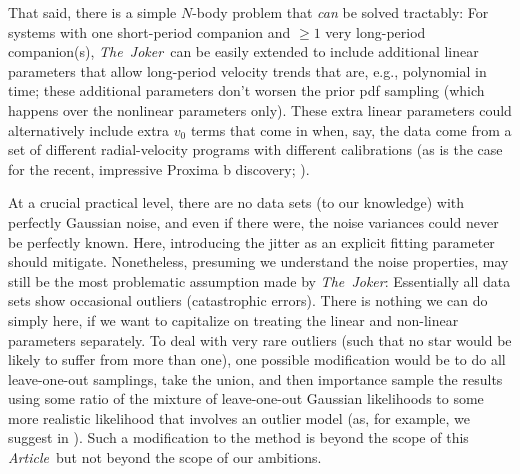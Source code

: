 \documentclass[manuscript, letterpaper]{aastex6}
\newcommand{\project}[1]{\textsl{#1}}
\newcommand{\samplername}{\project{The~Joker}}
\newcommand{\documentname}{\textsl{Article}}
\newcommand{\sectionname}{Section}
\begin{document}
That said, there is a simple $N$-body problem that \emph{can} be solved
tractably:
For systems with one short-period companion and $\geq1$ very long-period
companion(s), \samplername\ can be easily extended to include additional linear
parameters that allow long-period velocity trends that are, e.g., polynomial in
time; these additional parameters don't worsen the prior pdf sampling (which
happens over the nonlinear parameters only).
These extra linear parameters could alternatively include extra $v_0$ terms that
come in when, say, the data come from a set of different radial-velocity
programs with different calibrations (as is the case for the recent, impressive
Proxima b discovery; \citealt{Anglada-Escude:2016}).



At a crucial practical level, there are no data sets (to our knowledge) with
perfectly Gaussian noise, and even if there were, the noise variances
could never be perfectly known. Here, introducing the jitter as an explicit fitting parameter
should mitigate. Nonetheless, presuming we understand the noise properties,
may still be the most problematic  assumption made by
\samplername :
Essentially all data sets show occasional outliers (catastrophic errors).
There is nothing we can do simply here, if we want to capitalize on treating the
linear and non-linear parameters separately.
To deal with very rare outliers (such that no star would be likely to suffer
from more than one), one possible modification would be to do all leave-one-out
samplings, take the union, and then importance sample the results using some
ratio of the mixture of leave-one-out Gaussian likelihoods to some more
realistic likelihood that involves an outlier model (as, for example, we suggest
in \citealt{Hogg:2010a}).
Such a modification to the method is beyond the scope of this
\documentname\, but not beyond the scope of our ambitions.
\end{document}
